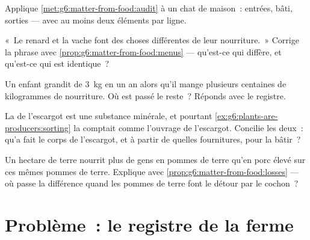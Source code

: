 \begin{exercise}[$\star\star$]\label{exo:g6:matter-from-food:8}
Applique \cref{met:g6:matter-from-food:audit} à un chat de maison~:
entrées, bâti, sorties --- avec au moins deux éléments par ligne.
\end{exercise}

\begin{exercise}[$\star\star$]\label{exo:g6:matter-from-food:9}
«~Le renard et la vache font des choses différentes de leur
nourriture.~» Corrige la phrase avec
\cref{prop:g6:matter-from-food:menus} --- qu'est-ce qui diffère, et
qu'est-ce qui est identique~?
\end{exercise}

\begin{exercise}[$\star\star$]\label{exo:g6:matter-from-food:10}
Un enfant grandit de \qty{3}{kg} en un an alors qu'il mange
plusieurs centaines de kilogrammes de nourriture. Où est passé le
reste~? Réponds avec le registre.
\end{exercise}

\begin{exercise}[$\star\star$]\label{exo:g6:matter-from-food:11}
La  de l'escargot est une substance minérale, et pourtant
\cref{ex:g6:plants-are-producers:sorting} la comptait comme
l'ouvrage de l'escargot. Concilie les deux~: qu'a fait le corps de
l'escargot, et à partir de quelles fournitures, pour la bâtir~?
\end{exercise}

\begin{exercise}[$\star\star\star$]\label{exo:g6:matter-from-food:12}
Un hectare de terre nourrit plus de gens en pommes de terre qu'en
porc élevé sur ces mêmes pommes de terre. Explique avec
\cref{prop:g6:matter-from-food:losses} --- où passe la différence
quand les pommes de terre font le détour par le cochon~?
\end{exercise}

\section{Problème~: le registre de la ferme}

